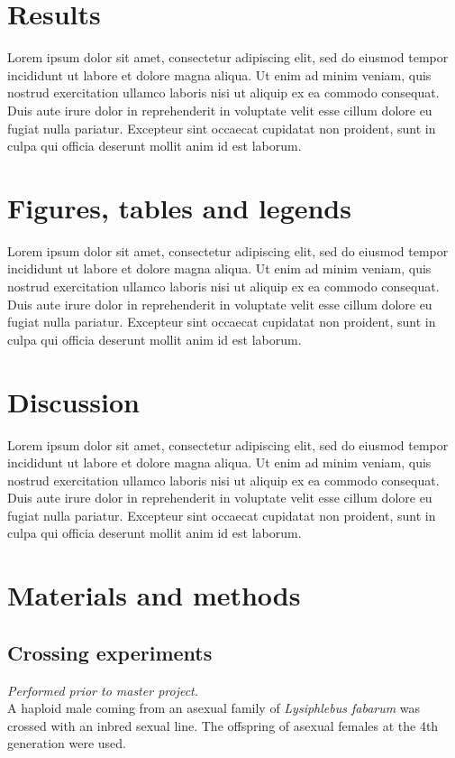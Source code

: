 \documentclass[11pt,a4paper]{report}
\begin{document}
\section*{Results}

Lorem ipsum dolor sit amet, consectetur adipiscing elit, sed do eiusmod tempor incididunt ut labore et dolore magna aliqua. Ut enim ad minim veniam, quis nostrud exercitation ullamco laboris nisi ut aliquip ex ea commodo consequat. Duis aute irure dolor in reprehenderit in voluptate velit esse cillum dolore eu fugiat nulla pariatur. Excepteur sint occaecat cupidatat non proident, sunt in culpa qui officia deserunt mollit anim id est laborum.

\section*{Figures, tables and legends}

Lorem ipsum dolor sit amet, consectetur adipiscing elit, sed do eiusmod tempor incididunt ut labore et dolore magna aliqua. Ut enim ad minim veniam, quis nostrud exercitation ullamco laboris nisi ut aliquip ex ea commodo consequat. Duis aute irure dolor in reprehenderit in voluptate velit esse cillum dolore eu fugiat nulla pariatur. Excepteur sint occaecat cupidatat non proident, sunt in culpa qui officia deserunt mollit anim id est laborum.

\FloatBarrier

\section*{Discussion}

Lorem ipsum dolor sit amet, consectetur adipiscing elit, sed do eiusmod tempor incididunt ut labore et dolore magna aliqua. Ut enim ad minim veniam, quis nostrud exercitation ullamco laboris nisi ut aliquip ex ea commodo consequat. Duis aute irure dolor in reprehenderit in voluptate velit esse cillum dolore eu fugiat nulla pariatur. Excepteur sint occaecat cupidatat non proident, sunt in culpa qui officia deserunt mollit anim id est laborum.

\section*{Materials and methods}

\subsection*{Crossing experiments}
\textit{Performed prior to master project.}\\
A haploid male coming from an asexual family of \textit{Lysiphlebus fabarum} was crossed with an inbred sexual line. The offspring of asexual females at the 4th generation were used.
\end{document}
